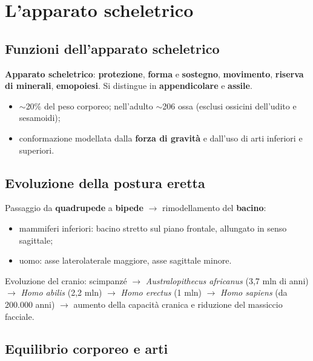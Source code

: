 \chapter{L'apparato scheletrico}

\section{Funzioni dell'apparato scheletrico}

\textbf{Apparato scheletrico}: \textbf{protezione}, \textbf{forma} e \textbf{sostegno},
\textbf{movimento}, \textbf{riserva di minerali}, \textbf{emopoiesi}. Si distingue in
\textbf{appendicolare} e \textbf{assile}.
\begin{itemize}
  \item $\sim$20\% del peso corporeo; nell'adulto $\sim$206 ossa (esclusi ossicini dell'udito e
    sesamoidi);
  \item conformazione modellata dalla \textbf{forza di gravità} e dall'uso di arti inferiori e
    superiori.
\end{itemize}

\section{Evoluzione della postura eretta}

Passaggio da \textbf{quadrupede} a \textbf{bipede} $\rightarrow$ rimodellamento del \textbf{bacino}:
\begin{itemize}
  \item mammiferi inferiori: bacino stretto sul piano frontale, allungato in senso sagittale;
  \item uomo: asse laterolaterale maggiore, asse sagittale minore.
\end{itemize}
Evoluzione del cranio: scimpanzé $\rightarrow$ \textit{Australopithecus africanus} (3,7 mln di anni)
$\rightarrow$ \textit{Homo abilis} (2,2 mln) $\rightarrow$ \textit{Homo erectus} (1 mln) $\rightarrow$
\textit{Homo sapiens} (da 200.000 anni) $\rightarrow$ aumento della capacità cranica e riduzione del
massiccio facciale.

\section{Equilibrio corporeo e arti}


